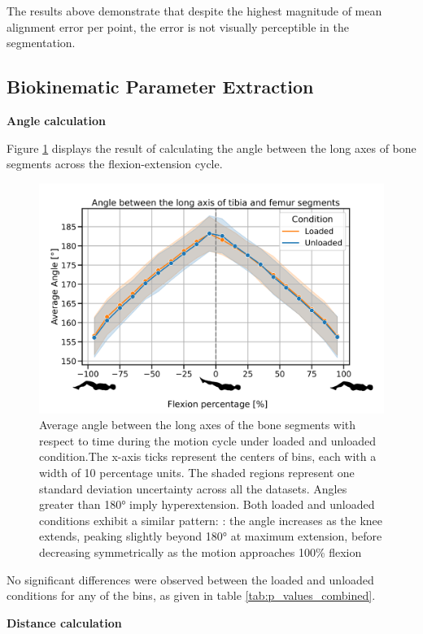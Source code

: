\documentclass{micro-econ-thesis}
\begin{document}
The results above demonstrate that despite the highest magnitude of mean alignment error per point, the error is not visually perceptible in the segmentation.   

\subsection{Biokinematic Parameter Extraction}

\textbf{Angle calculation}

Figure \ref{fig:anglegraphstickman} displays the result of calculating the angle between the long axes of bone segments across the flexion-extension cycle. 
 
\begin{figure}[H]
	\centering
	\includegraphics[width=0.7\linewidth]{angle_no_13_stick}
	\caption{Average angle between the long axes of the bone segments with respect to time during the motion cycle under loaded and unloaded condition.The x-axis ticks represent the centers of bins, each with a width of 10 percentage units. The shaded regions represent one standard deviation uncertainty across all the datasets. Angles greater than 180° imply hyperextension. Both loaded and unloaded conditions exhibit a similar pattern: : the angle increases as the knee extends, peaking slightly beyond 180° at maximum extension, before decreasing symmetrically as the motion approaches 100\% flexion}
	\label{fig:anglegraphstickman}
\end{figure}

No significant differences were observed between the loaded and unloaded conditions for any of the bins, as given in table \ref{tab:p_values_combined}. 

\textbf{Distance calculation }
\end{document}
